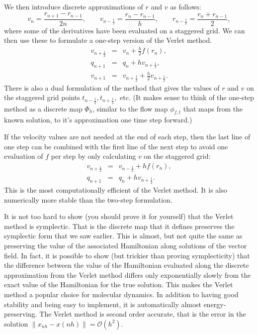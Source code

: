 \documentclass{article}
\begin{document}
We then introduce discrete approximations of $r$ and $v$ as follows:
$$
v_n =\frac{r_{n+1}-r_{n-1}}{2n},\qquad v_{n-\frac12} = \frac{r_n-r_{n-1}}{h}, \qquad r_{n-\frac12} = \frac{r_n + r_{n-1}}{2},
$$
where some of the derivatives have been evaluated on a staggered grid. We can then use these to formulate a one-step version of the Verlet method. 
\begin{eqnarray*}
	v_{n+\frac12} &=& v_n+\frac{h}{2}f(r_n),\\
	q_{n+1} &=& q_n +hv_{n+\frac12},\\
	v_{n+1} &=& v_{n+\frac12}+\frac{h}{2}v_{n+\frac12}.
\end{eqnarray*}
There is also a dual formulation of the method that gives the values of $r$ and $v$ on the staggered grid points $t_{n-\frac12},t_{n+\frac12},$ etc.
(It makes sense to think of the one-step method as a discrete map $\Phi_h$, similar to the flow map $\phi_{f,t}$ that maps from the known solution, to it's approximation one time step forward.)

If the velocity values are not needed at the end of each step, then the last line of one step can be combined with the first line of the next step to avoid one evaluation of $f$ per step by only calculating $v$ on the staggered grid:
\begin{eqnarray*}
	v_{n+\frac12} &=& v_{n-\frac12}+hf(r_n),\\
	q_{n+1} &=& q_n +hv_{n+\frac12}.
\end{eqnarray*}
This is the most computationally efficient of the Verlet method. It is also numerically more stable than the two-step formulation.

It is not too hard to show (you should prove it for yourself) that the Verlet method is symplectic. That is the discrete map that it defines preserves the symplectic form that we saw earlier. This is almost, but not quite the same as preserving the value of the associated Hamiltonian along solutions of the vector field. In fact, it is possible to show (but trickier than proving symplecticity) that the difference between the value of the Hamiltonian evaluated along the discrete approximation from the Verlet method differs only exponentially slowly from the exact value of the Hamiltonian for the true solution. This makes the Verlet method a popular choice for molecular dynamics. In addition to having good stability and being easy to implement, it is automatically almost energy-preserving. The Verlet method is second order accurate, that is the error in the solution $\|x_{nh}-x(nh)\|=\mathcal{O}(h^2)$.
\end{document}
